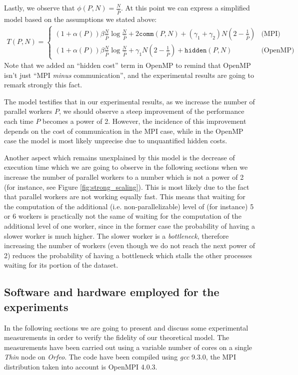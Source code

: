 \documentclass{article}
\begin{document}
Lastly, we observe that $\phi(P,N) = \frac{N}{\hat{P}}$. At this point we can
express a simplified model based on the assumptions we stated above:
\begin{gather*}
    T(P,N) = \begin{cases}
        (1+\alpha(P)) \beta \frac{N}{\hat{P}} \log \frac{N}{\hat{P}} + 2\texttt{comm}(P,N) + (\gamma_1 + \gamma_2) N \left(2 - \frac{1}{\hat{P}}\right) &\text{(MPI)}\\
        (1+\alpha(P)) \beta \frac{N}{\hat{P}} \log \frac{N}{\hat{P}} + \gamma_1 N \left(2 - \frac{1}{\hat{P}}\right) + \texttt{hidden}(P,N) &\text{(OpenMP)}
    \end{cases}
\end{gather*}
Note that we added an ``hidden cost'' term in OpenMP to remind that OpenMP isn't
just ``MPI \emph{minus} communication'', and the experimental results are going
to remark strongly this fact.

The model testifies that in our experimental results, as we increase the number
of parallel workers $P$, we should observe a steep improvement of the
performance each time $P$ becomes a power of 2. However, the incidence of this
improvement depends on the cost of communication in the MPI case, while in the
OpenMP case the model is most likely unprecise due to unquantified hidden
costs.

Another aspect which remains unexplained by this model is the decrease of
execution time which we are going to observe in the following sections when
we increase the number of parallel workers to a number which is not a power of
2 (for instance, see Figure \ref{fig:strong_scaling}). This is most likely due
to the fact that parallel workers are not working equally fast. This means
that waiting for the computation of the additional (i.e. non-parallelizable)
level of (for instance) 5 or 6 workers is practically not the same of waiting
for the computation of the additional level of one worker, since in the former
case the probability of having a slower worker is much higher. The slower worker
is a \emph{bottleneck}, therefore increasing the number of workers (even though
we do not reach the next power of 2) reduces the probability of having a
bottleneck which stalls the other processes waiting for its portion of the
dataset.

\subsection{Software and hardware employed for the experiments}
In the following sections we are going to present and discuss some experimental
measurements in order to verify the fidelity of our theoretical model. The
measurements have been carried out using a variable number of cores on a single
\emph{Thin} node on \emph{Orfeo}. The code have been compiled using \emph{gcc}
9.3.0, the MPI distribution taken into account is OpenMPI 4.0.3.
\end{document}
